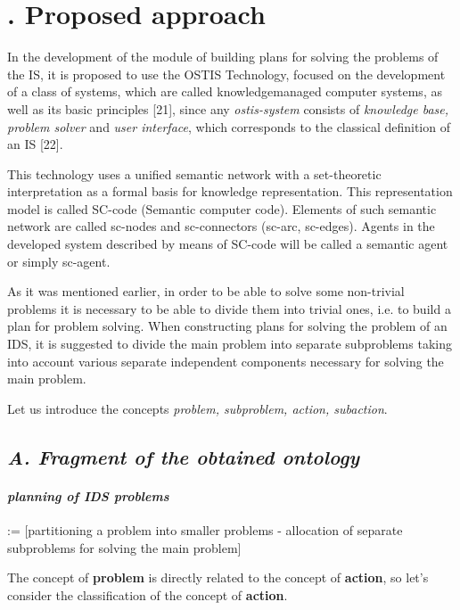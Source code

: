 \documentclass[a4paper, 10pt,]{article}
\begin{document}

\section*{\uppercase\expandafter{}. Proposed approach}
\hspace{0.5cm} In the development of the module of building plans
for solving the problems of the IS, it is proposed to
use the OSTIS Technology, focused on the development
of a class of systems, which are called knowledgemanaged computer systems, as well as its basic principles
[21], since any \textit{ostis-system} consists of \textit{knowledge base,
problem solver} and \textit{user interface}, which corresponds to
the classical definition of an IS [22].

This technology uses a unified semantic network with
a set-theoretic interpretation as a formal basis for knowledge representation. This representation model is called
SC-code (Semantic computer code). Elements of such
semantic network are called sc-nodes and sc-connectors
(sc-arc, sc-edges). Agents in the developed system described by means of SC-code will be called a semantic
agent or simply sc-agent.

As it was mentioned earlier, in order to be able to
solve some non-trivial problems it is necessary to be able
to divide them into trivial ones, i.e. to build a plan for
problem solving. When constructing plans for solving
the problem of an IDS, it is suggested to divide the main
problem into separate subproblems taking into account
various separate independent components necessary for
solving the main problem.

Let us introduce the concepts \textit{problem, subproblem,
action, subaction}.

\subsection*{\textit{A. Fragment of the obtained ontology}}

\paragraph{\textbf{\textit{planning of IDS problems}}}
\hfill\break:= [partitioning a problem into smaller problems - allocation of separate subproblems for solving the main
problem]

The concept of \textbf{problem} is directly related to the
concept of \textbf{action}, so let’s consider the classification of
the concept of \textbf{action}.
\end{document}
